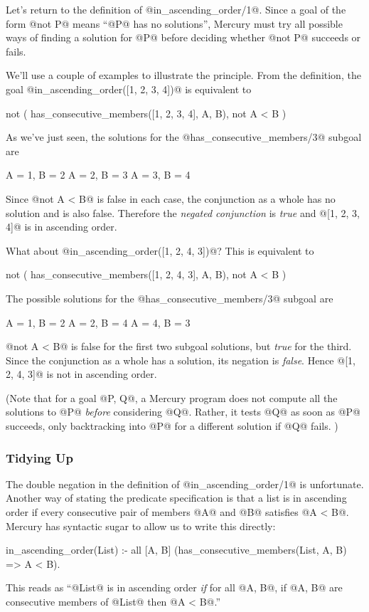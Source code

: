 Let's return to the definition of @in_ascending_order/1@.  Since a goal
of the form @not P@ means ``@P@ has no solutions'', Mercury must try all
possible ways of finding a solution for @P@ before deciding whether
@not P@ succeeds or fails.

We'll use a couple of examples to illustrate the principle.
From the definition, the goal @in_ascending_order([1, 2, 3, 4])@ is
equivalent to
\begin{myverbatim}
    not (
        has_consecutive_members([1, 2, 3, 4], A, B),
        not A < B
    )
\end{myverbatim}
As we've just seen, the solutions for the @has_consecutive_members/3@
subgoal are
\begin{myverbatim}
    A = 1, B = 2
    A = 2, B = 3
    A = 3, B = 4
\end{myverbatim}
Since @not A < B@ is false in each case, the conjunction as a whole has
no solution and is
also false.  Therefore the \emph{negated conjunction} is \emph{true}
and @[1, 2, 3, 4]@ is in ascending order.

What about @in_ascending_order([1, 2, 4, 3])@?  This is equivalent to
\begin{myverbatim}
    not (
        has_consecutive_members([1, 2, 4, 3], A, B),
        not A < B
    )
\end{myverbatim}
The possible solutions for the @has_consecutive_members/3@ subgoal are
\begin{myverbatim}
    A = 1, B = 2
    A = 2, B = 4
    A = 4, B = 3
\end{myverbatim}
@not A < B@ is false for the first two subgoal solutions, but
\emph{true} for the third.  Since the conjunction as a whole has a
solution, its negation is \emph{false}.  Hence @[1, 2, 4, 3]@ is not in
ascending order.

(Note that for a goal @P, Q@, a Mercury program does not compute all
the solutions to @P@ \emph{before} considering @Q@.  Rather, it tests
@Q@ as soon as @P@ succeeds, only backtracking into
@P@ for a different solution if @Q@ fails.  )

\subsubsection{Tidying Up}

The double negation in the definition of @in_ascending_order/1@ is
unfortunate.  Another way of stating the predicate specification is that
a list is in ascending order if every consecutive pair of members @A@
and @B@ satisfies @A < B@.  Mercury has syntactic sugar to allow us to
write this directly:
\begin{myverbatim}
in_ascending_order(List) :-
    all [A, B] (has_consecutive_members(List, A, B) => A < B).
\end{myverbatim}
This reads as ``@List@ is in ascending order \emph{if} for all @A, B@,
if @A, B@ are consecutive members of @List@ then @A < B@.''

